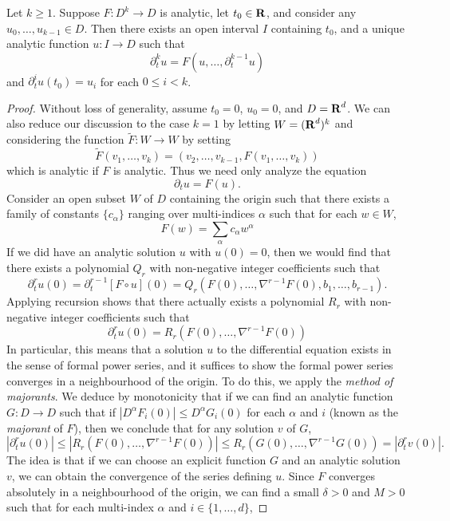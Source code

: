 \begin{lemma}
    Let $k \geq 1$. Suppose $F: D^k \to D$ is analytic, let $t_0 \in \operatorname{\mathbf{R}}$, and consider any $u_0,\dots,u_{k-1} \in D$. Then there exists an open interval $I$ containing $t_0$, and a unique analytic function $u: I \to D$ such that
    \[ \partial_t^k u = F(u,\dots,\partial_t^{k-1} u) \]
    and $\partial_t^i u(t_0) = u_i$ for each $0 \leq i < k$.
\end{lemma}
\begin{proof}
    Without loss of generality, assume $t_0 = 0$, $u_0 = 0$, and $D = \operatorname{\mathbf{R}}^d$. We can also reduce our discussion to the case $k = 1$ by letting $W = (\operatorname{\mathbf{R}}^d)^k$ and considering the function $\tilde{F}: W \to W$ by setting
    \[ \tilde{F}(v_1,\dots,v_k) = (v_2,\dots,v_{k-1},F(v_1,\dots,v_k)) \]
    which is analytic if $F$ is analytic. Thus we need only analyze the equation
    \[ \partial_t u = F(u). \]
    Consider an open subset $W$ of $D$ containing the origin such that there exists a family of constants $\{ c_\alpha \}$ ranging over multi-indices $\alpha$ such that for each $w \in W$,
    \[ F(w) = \sum_\alpha c_\alpha w^\alpha \]
    If we did have an analytic solution $u$ with $u(0) = 0$, then we would find that there exists a polynomial $Q_r$ with non-negative integer coefficients such that
    \[ \partial_t^r u(0) = \partial_t^{r-1} [F \circ u](0) = Q_r(F(0),\dots,\nabla^{r-1} F(0),b_1,\dots,b_{r-1}). \]
    Applying recursion shows that there actually exists a polynomial $R_r$ with non-negative integer coefficients such that
    \[ \partial_t^r u(0) = R_r(F(0),\dots,\nabla^{r-1} F(0)) \]
    In particular, this means that a solution $u$ to the differential equation exists in the sense of formal power series, and it suffices to show the formal power series converges in a neighbourhood of the origin. To do this, we apply the \emph{method of majorants}. We deduce by monotonicity that if we can find an analytic function $G: D \to D$ such that if $|D^\alpha F_i(0)| \leq D^\alpha G_i(0)$ for each $\alpha$ and $i$ (known as the \emph{majorant} of $F$), then we conclude that for any solution $v$ of $G$,
    \[ |\partial_t^r u(0)| \leq |R_r(F(0),\dots,\nabla^{r-1} F(0))| \leq R_r(G(0),\dots,\nabla^{r-1}G(0)) = |\partial_t^r v(0)|. \]
    The idea is that if we can choose an explicit function $G$ and an analytic solution $v$, we can obtain the convergence of the series defining $u$. Since $F$ converges absolutely in a neighbourhood of the origin, we can find a small $\delta > 0$ and $M > 0$ such that for each multi-index $\alpha$ and $i \in \{ 1, \dots, d \}$,

\end{proof}
